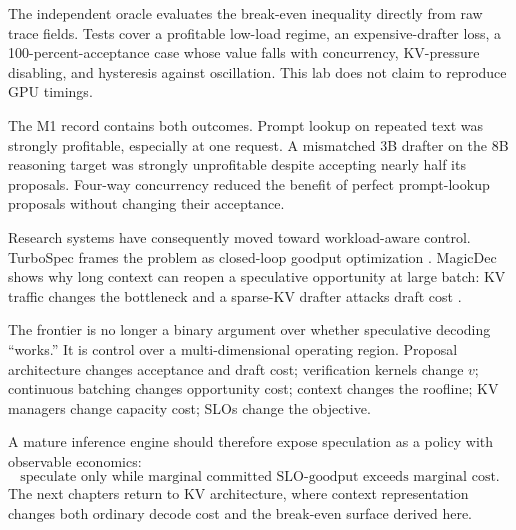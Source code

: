 The independent oracle evaluates the break-even inequality directly from raw trace
fields. Tests cover a profitable low-load regime, an expensive-drafter loss, a
100-percent-acceptance case whose value falls with concurrency, KV-pressure disabling,
and hysteresis against oscillation. This lab does not claim to reproduce GPU timings.


The M1 record contains both outcomes. Prompt lookup on repeated text was strongly
profitable, especially at one request. A mismatched 3B drafter on the 8B reasoning
target was strongly unprofitable despite accepting nearly half its proposals. Four-way
concurrency reduced the benefit of perfect prompt-lookup proposals without changing
their acceptance.

Research systems have consequently moved toward workload-aware control. TurboSpec
frames the problem as closed-loop goodput optimization \cite{liu2024turbospec}.
MagicDec shows why long context can reopen a speculative opportunity at large batch:
KV traffic changes the bottleneck and a sparse-KV drafter attacks draft cost
\cite{sadhukhan2024magicdec}.


The frontier is no longer a binary argument over whether speculative decoding ``works.''
It is control over a multi-dimensional operating region. Proposal architecture changes
acceptance and draft cost; verification kernels change $v$; continuous batching changes
opportunity cost; context changes the roofline; KV managers change capacity cost; SLOs
change the objective.

A mature inference engine should therefore expose speculation as a policy with
observable economics:
\[
\boxed{
\text{speculate only while marginal committed SLO-goodput exceeds marginal cost.}
}
\]
The next chapters return to KV architecture, where context representation changes both
ordinary decode cost and the break-even surface derived here.

